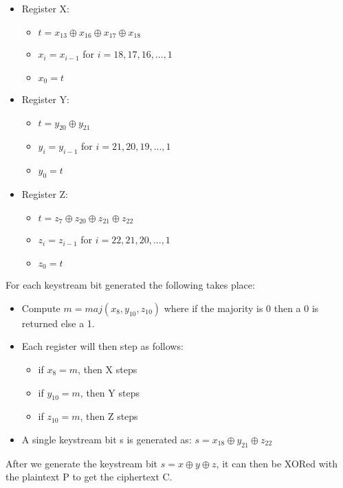 \documentclass{article}
\begin{document}
\begin{itemize}
    \item Register X:
    \begin{itemize}
        \item $t = x_{13} \oplus x_{16} \oplus x_{17} \oplus x_{18}$
        \item $x_i = x_{i-1}$ for $i = 18,17,16,...,1$
        \item $x_0 = t$
    \end{itemize}
    \item Register Y:
    \begin{itemize}
        \item $t = y_{20} \oplus y_{21}$
        \item $y_i = y_{i-1}$ for $i = 21,20,19,...,1$
        \item $y_0 = t$
    \end{itemize}
    \item Register Z:
    \begin{itemize}
        \item $t = z_{7} \oplus z_{20} \oplus z_{21} \oplus z_{22}$
        \item $z_i = z_{i-1}$ for $i = 22,21,20,...,1$
        \item $z_0 = t$
    \end{itemize}
\end{itemize}

For each keystream bit generated the following takes place:
\begin{itemize}
    \item Compute $m = maj(x_8,y_{10},z_{10})$ where if the majority is 0 then a 0 is returned else a 1.
    \item Each register will then step as follows:
    \begin{itemize}
        \item if $x_8 = m$, then X steps
        \item if $y_{10} = m$, then Y steps
        \item if $z_{10} = m$, then Z steps
    \end{itemize}
    \item A single keystream bit s is generated as: $s = x_{18} \oplus y_{21} \oplus z_{22}$
\end{itemize}

After we generate the keystream bit $s = x \oplus y \oplus z$, it can then be XORed with the plaintext P to get the ciphertext C.
\end{document}
